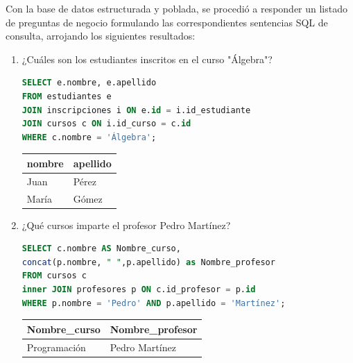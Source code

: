 \documentclass[12pt,letterpaper]{article}
\begin{document}
Con la base de datos estructurada y poblada, se procedió a responder un listado de preguntas de negocio formulando las correspondientes sentencias SQL de consulta, arrojando los siguientes resultados:

\begin{enumerate}
    \item ¿Cuáles son los estudiantes inscritos en el curso "Álgebra"?
\begin{lstlisting}[language=SQL, frame=single]
SELECT e.nombre, e.apellido 
FROM estudiantes e 
JOIN inscripciones i ON e.id = i.id_estudiante 
JOIN cursos c ON i.id_curso = c.id 
WHERE c.nombre = 'Álgebra';
\end{lstlisting}
    \begin{table}[H]
        \centering
        \begin{tabular}{|l|l|}
        \hline
        \textbf{nombre} & \textbf{apellido} \\ \hline
        Juan & Pérez \\ 
        María & Gómez \\ \hline
        \end{tabular}
    \end{table}

    \item ¿Qué cursos imparte el profesor Pedro Martínez?
\begin{lstlisting}[language=SQL, frame=single]
SELECT c.nombre AS Nombre_curso, 
concat(p.nombre, " ",p.apellido) as Nombre_profesor
FROM cursos c
inner JOIN profesores p ON c.id_profesor = p.id 
WHERE p.nombre = 'Pedro' AND p.apellido = 'Martínez';
\end{lstlisting}
    \begin{table}[H]
        \centering
        \begin{tabular}{|l|l|}
        \hline
        \textbf{Nombre\_curso} & \textbf{Nombre\_profesor} \\ \hline
        Programación & Pedro Martínez \\ \hline
        \end{tabular}
    \end{table}


\end{enumerate}
\end{document}
